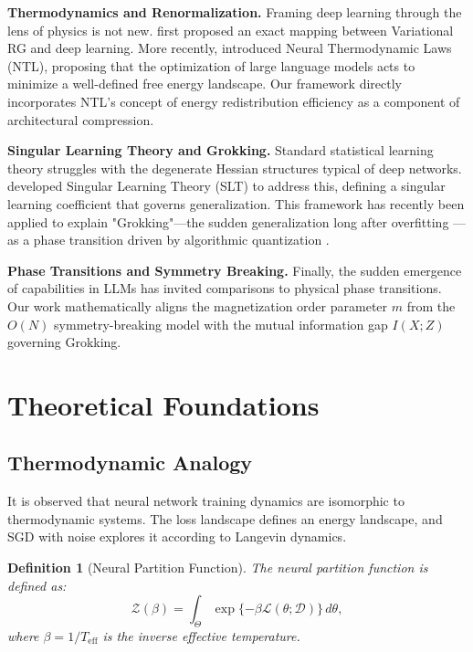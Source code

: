 \documentclass[11pt, a4paper]{article}
\newtheorem{dfn}[theo]{Definition}
\theoremstyle{plain}
\def\sZ{{\mathcal Z}}
\def\sD{{\mathcal D}}
\begin{document}
\textbf{Thermodynamics and Renormalization.} Framing deep learning through the lens of physics is not new. \citet{mehta2006renormalization} first proposed an exact mapping between Variational RG and deep learning. More recently, \citet{tegmark2505.10559} introduced Neural Thermodynamic Laws (NTL), proposing that the optimization of large language models acts to minimize a well-defined free energy landscape. Our framework directly incorporates NTL's concept of energy redistribution efficiency as a component of architectural compression.

\textbf{Singular Learning Theory and Grokking.} Standard statistical learning theory struggles with the degenerate Hessian structures typical of deep networks. \citet{watanabe2007singular,watanabe2009algebraic} developed Singular Learning Theory (SLT) to address this, defining a singular learning coefficient that governs generalization. This framework has recently been applied to explain "Grokking"---the sudden generalization long after overfitting \citep{power2022grokking}---as a phase transition driven by algorithmic quantization \citep{michaud2023quantization}.

\textbf{Phase Transitions and Symmetry Breaking.} Finally, the sudden emergence of capabilities in LLMs \citep{wei2022phase} has invited comparisons to physical phase transitions. Our work mathematically aligns the magnetization order parameter $m$ from the $O(N)$ symmetry-breaking model with the mutual information gap $I(X;Z)$ governing Grokking.

\section{Theoretical Foundations}

\subsection{Thermodynamic Analogy}

It is observed that neural network training dynamics are isomorphic to thermodynamic systems. The loss landscape defines an energy landscape, and SGD with noise explores it according to Langevin dynamics.

\begin{dfn}[Neural Partition Function]\label{dfn:partition}
The neural partition function is defined as:
\begin{equation}
\sZ(\beta) = \int_{\Theta} \exp\{-\beta \mathcal{L}(\theta; \sD)\} \, d\theta,
\label{eq:partition}
\end{equation}
where $\beta = 1/T_{\text{eff}}$ is the inverse effective temperature.
\end{dfn}
\end{document}
